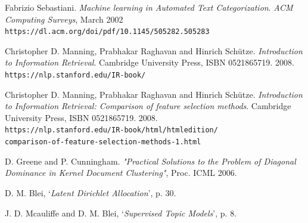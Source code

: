 \documentclass{article}
\begin{document}
\begin{thebibliography}{9}
Fabrizio Sebastiani. 
\textit{Machine learning in Automated Text Categorization}. 
\textit{ACM Computing Surveys}, March 2002 
\\\texttt{https://dl.acm.org/doi/pdf/10.1145/505282.505283}

Christopher D. Manning, Prabhakar Raghavan and Hinrich Schütze. 
\textit{Introduction to Information Retrieval}.
Cambridge University Press, ISBN 0521865719. 2008.
\\\texttt{https://nlp.stanford.edu/IR-book/}

Christopher D. Manning, Prabhakar Raghavan and Hinrich Schütze. 
\textit{Introduction to Information Retrieval: Comparison of feature selection methods}.
Cambridge University Press, ISBN 0521865719. 2008.
\\\texttt{https://nlp.stanford.edu/IR-book/html/htmledition/
\\
comparison-of-feature-selection-methods-1.html}

D. Greene and P. Cunningham. \textit{"Practical Solutions to the Problem of Diagonal Dominance in Kernel Document Clustering"}, Proc. ICML 2006.

D. M. Blei, ‘\textit{Latent Dirichlet Allocation}’, p. 30.


J. D. Mcauliffe and D. M. Blei, ‘\textit{Supervised Topic Models}’, p. 8.



\end{thebibliography}

\medskip
\end{document}
